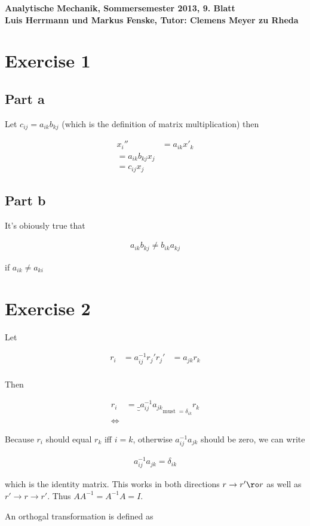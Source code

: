 \documentclass[a4paper,german,12pt,smallheadings]{scrartcl}
\begin{document}
\begin{center}
\bfseries %
\sffamily %
\vspace{-40pt}
Analytische Mechanik, Sommersemester 2013, 9. Blatt \\
Luis Herrmann und Markus Fenske, Tutor: Clemens Meyer zu Rheda
\vspace{-10pt}
\end{center}
\section*{Exercise 1}
\subsection*{Part a}

Let $c_{ij} = a_{ik} b_{kj}$ (which is the definition of matrix multiplication)
then

\begin{align*}
  x_i'' &= a_{ik} x'_k \\
         = a_{ik} b_{kj} x_j \\
         = c_{ij} x_j
\end{align*}

\subsection*{Part b}

It's obiously true that

\begin{align*}
  a_{ik} b_{kj} \neq b_{ik} a_{kj}
\end{align*}

if $a_{ik} \neq a_{ki}$


\section*{Exercise 2}

Let

\begin{align*}
  r_i  &= a^{-1}_{ij} r_j'
  r_j' &= a_{jk} r_k \\
\end{align*}

Then

\begin{align*}
   r_i  &= \underbrace_{a^{-1}_{ij} a_{jk}}_{\text{must $= \delta_{ik}$}} r_k \\
   \Leftrightarrow
\end{align*}

Because $r_i$ should equal $r_k$ iff $i = k$, otherwise $a^{-1}_{ij} a_{jk}$
should be zero, we can write

\begin{align*}
  a^{-1}_{ij} a_{jk} = \delta_{ik}
\end{align*}

which is the identity matrix. This works in both directions $r \to r' \ro r$ as
well as $r' \to r \to r'$. Thus $AA^{-1} = A^{-1}A = I$.

An orthogal transformation is defined as 
\end{document}
